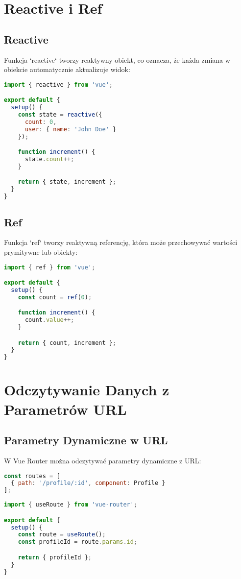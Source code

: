 \documentclass[a4paper,12pt]{article}
\begin{document}
\section{Reactive i Ref}
\subsection{Reactive}
Funkcja `reactive` tworzy reaktywny obiekt, co oznacza, że każda zmiana w obiekcie automatycznie aktualizuje widok:
\begin{lstlisting}[language=JavaScript]
import { reactive } from 'vue';

export default {
  setup() {
    const state = reactive({
      count: 0,
      user: { name: 'John Doe' }
    });

    function increment() {
      state.count++;
    }

    return { state, increment };
  }
}
\end{lstlisting}

\subsection{Ref}
Funkcja `ref` tworzy reaktywną referencję, która może przechowywać wartości prymitywne lub obiekty:
\begin{lstlisting}[language=JavaScript]
import { ref } from 'vue';

export default {
  setup() {
    const count = ref(0);

    function increment() {
      count.value++;
    }

    return { count, increment };
  }
}
\end{lstlisting}

\section{Odczytywanie Danych z Parametrów URL}
\subsection{Parametry Dynamiczne w URL}
W Vue Router można odczytywać parametry dynamiczne z URL:
\begin{lstlisting}[language=JavaScript]
const routes = [
  { path: '/profile/:id', component: Profile }
];
\end{lstlisting}

\begin{lstlisting}[language=JavaScript]
import { useRoute } from 'vue-router';

export default {
  setup() {
    const route = useRoute();
    const profileId = route.params.id;

    return { profileId };
  }
}
\end{lstlisting}
\end{document}

